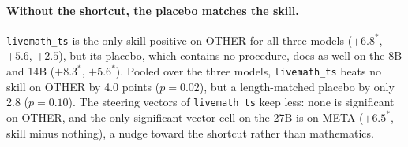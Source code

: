 \documentclass[11pt]{article}
\begin{document}
\begin{table}[t]
\centering\small
{}
\caption{LiveMath by the meta option (556 items: the 608 minus SkillOpt's 52 train and validation
items). Change in points against no skill; $^{*}$ $p<0.05$. META: the option ``One of the remaining
options is correct, but a stronger result can be proven'', correct whenever present. The placebo
is length-matched to \texttt{livemath\_ts}.}
\label{tab:meta}
\end{table}

\paragraph{Without the shortcut, the placebo matches the skill.} \texttt{livemath\_ts} is the only
skill positive on OTHER for all three models ($+6.8^{*}$, $+5.6$, $+2.5$), but its placebo, which
contains no procedure, does as well on the 8B and 14B ($+8.3^{*}$, $+5.6^{*}$). Pooled over the three
models, \texttt{livemath\_ts} beats no skill on OTHER by 4.0 points ($p=0.02$), but a length-matched
placebo by only 2.8 ($p=0.10$). The steering vectors of \texttt{livemath\_ts} keep less: none is significant on OTHER,
and the only significant vector cell on the 27B is on META ($+6.5^{*}$, skill minus nothing), a
nudge toward the shortcut rather than mathematics.
\end{document}

